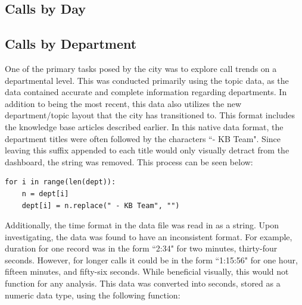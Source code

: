 \documentclass[11pt,twocolumn]{article}
\begin{document}
	\subsection{Calls by Day}



	\subsection{Calls by Department}

One of the primary tasks posed by the city was to explore call trends on a departmental level.  This was conducted primarily using the topic data, as the data contained accurate and complete information regarding departments.  In addition to being the most recent, this data also utilizes the new department/topic layout that the city has transitioned to.  This format includes the knowledge base articles described earlier.  In this native data format, the department titles were often followed by the characters ``- KB Team".  Since leaving this suffix appended to each title would only visually detract from the dashboard, the string was removed.  This process can be seen below:\\

  \begin{Verbatim}[fontsize=\small]
  for i in range(len(dept)):
    n = dept[i]
    dept[i] = n.replace(" - KB Team", "")
  \end{Verbatim}


Additionally, the time format in the data file was read in as a string.  Upon investigating, the data was found to have an inconsistent format.  For example, duration for one record was in the form ``2:34" for two minutes, thirty-four seconds.  However, for longer calls it could be in the form ``1:15:56" for one hour, fifteen minutes, and fifty-six seconds.  While beneficial visually, this would not function for any analysis.  This data was converted into seconds, stored as a numeric data type, using the following function:
\end{document}
